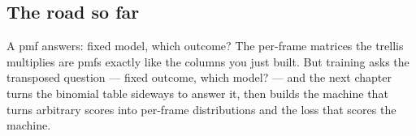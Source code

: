 \cleardoublepage
\begin{narrative}
\section*{The road so far}


\noindent A pmf answers: fixed model, which outcome? The per-frame matrices the trellis multiplies are pmfs exactly like the columns you just built. But training asks the transposed question — fixed outcome, which model? — and the next chapter turns the binomial table sideways to answer it, then builds the machine that turns arbitrary scores into per-frame distributions and the loss that scores the machine.
\end{narrative}

